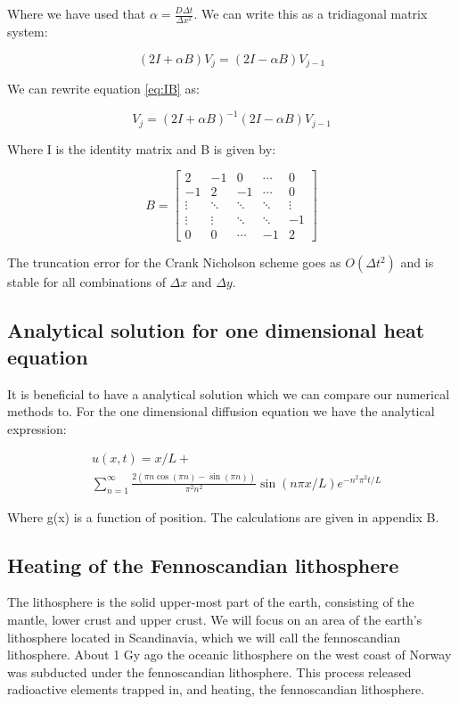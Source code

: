 \documentclass{article}
\begin{document}
\begin{multicols}{2}
Where we have used that $\alpha = \frac{D\Delta t}{\Delta x^2}$. We can write this as a tridiagonal matrix system:

\begin{equation}
(2I+\alpha B)V_j=(2I-\alpha B)V_{j-1}
\label{eq:IB}
\end{equation}

We can rewrite equation \ref{eq:IB} as:

\begin{equation}
V_j = (2I+\alpha B)^{-1}(2I-\alpha B)V_{j-1}
\end{equation}

Where I is the identity matrix and B is given by:

\begin{equation*}
B = 
\begin{bmatrix}
2 & -1 & 0 & \cdots & 0 \\
-1 & 2 & -1 & \cdots & 0  \\
\vdots  & \ddots  & \ddots & \ddots & \vdots  \\
\vdots  & \vdots  & \ddots & \ddots & -1  \\
0 & 0 & \cdots & -1 & 2
\end{bmatrix}
\end{equation*}

The truncation error for the Crank Nicholson scheme goes as $O(\Delta t^2)$ and is stable for all combinations of $\Delta x$ and $\Delta y$. 

\subsection{Analytical solution for one dimensional heat equation}

It is beneficial to have a analytical solution which we can compare our numerical methods to. For the one dimensional diffusion equation we have the analytical expression:

\begin{equation}
\begin{split}
&u(x,t)=x/L+\\
&\sum_{n=1}^{\infty}\frac{2(\pi n \cos{(\pi n)}-\sin{(\pi n)})}{\pi^2n^2}\sin{(n\pi x/L)}e^{-n^2\pi^2t/L}
\end{split}
\label{eq:ana_sol}
\end{equation}

Where g(x) is a function of position. The calculations are given in appendix B. 

\subsection{Heating of the Fennoscandian lithosphere}
The lithosphere is the solid upper-most part of the earth, consisting of the mantle, lower crust and upper crust. We will focus on an area of the earth's lithosphere located in Scandinavia, which we will call the fennoscandian lithosphere. About 1 Gy ago the oceanic lithosphere on the west coast of Norway was subducted under the fennoscandian lithosphere. This process released radioactive elements trapped in, and heating, the fennoscandian lithosphere. 


\end{multicols}
\end{document}
